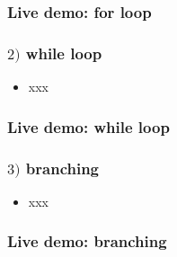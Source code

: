 \documentclass[english,14pt]{beamer}
\begin{document}
\begin{frame}[fragile]

\frametitle{Live demo: for loop}

\end{frame}


\begin{frame}[fragile]

\frametitle{$2)$ while loop}

\begin{itemize}
	\item xxx
\end{itemize}

\end{frame}


\begin{frame}[fragile]

\frametitle{Live demo: while loop}

\end{frame}


\begin{frame}[fragile]

\frametitle{$3)$ branching}

\begin{itemize}
	\item xxx
\end{itemize}

\end{frame}


\begin{frame}[fragile]

\frametitle{Live demo: branching}

\end{frame}
\end{document}
